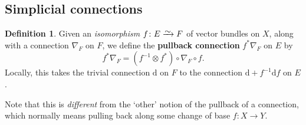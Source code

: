 \documentclass[11pt,fleqn]{article}
\theoremstyle{plain}
\theoremstyle{definition}
\newtheorem{definition}[theorem]{Definition}
\theoremstyle{remark}
\numberwithin{equation}{theorem}
\newcommand{\congto}{\xrightarrow{\raisebox{-.5ex}[0ex][0ex]{$\sim$}}}
\newcommand{\define}[1]{\textbf{#1}}
\renewcommand{\d}{\mathrm{d}}
\begin{document}
    \subsection{Simplicial connections}

        \begin{definition}
            Given an \emph{isomorphism} $f\colon E\congto F$ of vector bundles on $X$, along with a connection $\nabla_F$ on $F$, we define the \define{pullback connection} $f^*\nabla_F$ on $E$ by
            \[
                f^*\nabla_F = (f^{-1}\otimes f^*)\circ\nabla_F\circ f.
            \]
            Locally, this takes the trivial connection $\d$ on $F$ to the connection $\d+f^{-1}\d f$ on $E$.

            Note that this is \emph{different} from the `other' notion of the pullback of a connection, which normally means pulling back along some change of base $f\colon X\to Y$.
        \end{definition}
\end{document}
